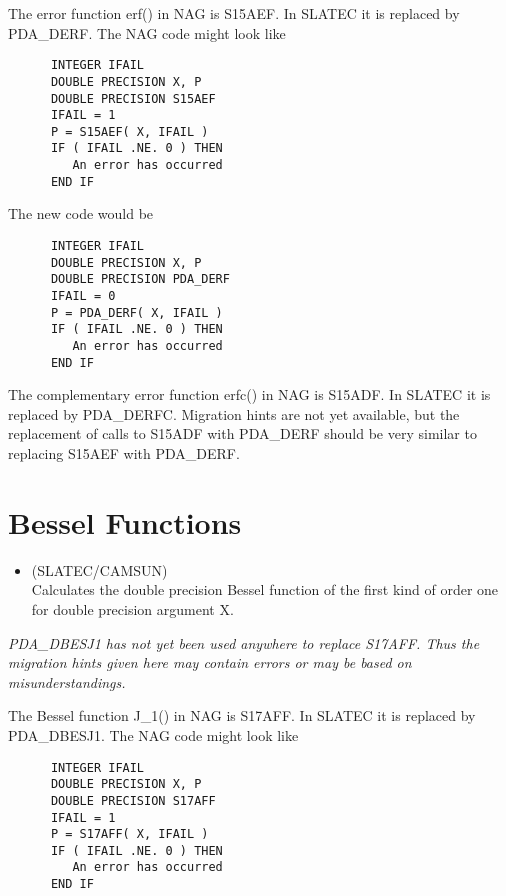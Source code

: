    The error function erf() in NAG is S15AEF. In SLATEC it is replaced
   by PDA\_DERF. The NAG code might look like

\begin{verbatim}
      INTEGER IFAIL
      DOUBLE PRECISION X, P
      DOUBLE PRECISION S15AEF
      IFAIL = 1
      P = S15AEF( X, IFAIL )
      IF ( IFAIL .NE. 0 ) THEN
         An error has occurred
      END IF
\end{verbatim}

   The new code would be

\begin{verbatim}
      INTEGER IFAIL
      DOUBLE PRECISION X, P
      DOUBLE PRECISION PDA_DERF
      IFAIL = 0
      P = PDA_DERF( X, IFAIL )
      IF ( IFAIL .NE. 0 ) THEN
         An error has occurred
      END IF
\end{verbatim}

   The complementary error function erfc() in NAG is S15ADF. In SLATEC
   it is replaced by PDA\_DERFC. Migration hints are not yet available,
   but the replacement of calls to S15ADF with PDA\_DERF should be very
   similar to replacing S15AEF with PDA\_DERF.


\section{Bessel Functions}

\begin{itemize}

\item {} (SLATEC/CAMSUN)\\
   Calculates the double precision Bessel function of the first kind
   of order one for double precision argument X.

\end{itemize}

{\em PDA\_DBESJ1 has not yet been used anywhere to replace S17AFF. Thus the
   migration hints given here may contain errors or may be based on
   misunderstandings.}

   The Bessel function J\_1() in NAG is S17AFF. In SLATEC it is replaced
   by PDA\_DBESJ1. The NAG code might look like

\begin{verbatim}
      INTEGER IFAIL
      DOUBLE PRECISION X, P
      DOUBLE PRECISION S17AFF
      IFAIL = 1
      P = S17AFF( X, IFAIL )
      IF ( IFAIL .NE. 0 ) THEN
         An error has occurred
      END IF
\end{verbatim}

